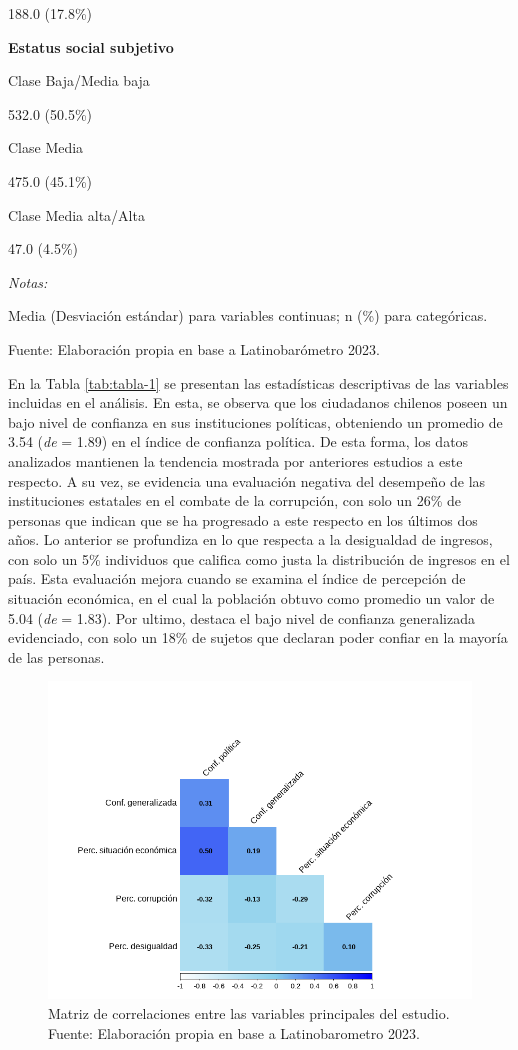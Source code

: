 \documentclass[12pt,twoside]{templates/facsothesis}
\begin{document}
188.0 (17.8\%)

\textbf{Estatus social subjetivo}

Clase Baja/Media baja

532.0 (50.5\%)

Clase Media

475.0 (45.1\%)

Clase Media alta/Alta

47.0 (4.5\%)

{\emph{Notas:}}

Media (Desviación estándar) para variables continuas; n (\%) para categóricas.

Fuente: Elaboración propia en base a Latinobarómetro 2023.

En la Tabla \ref{tab:tabla-1} se presentan las estadísticas descriptivas de las variables incluidas en el análisis. En esta, se observa que los ciudadanos chilenos poseen un bajo nivel de confianza en sus instituciones políticas, obteniendo un promedio de 3.54 (\emph{de} = 1.89) en el índice de confianza política. De esta forma, los datos analizados mantienen la tendencia mostrada por anteriores estudios a este respecto. A su vez, se evidencia una evaluación negativa del desempeño de las instituciones estatales en el combate de la corrupción, con solo un 26\% de personas que indican que se ha progresado a este respecto en los últimos dos años. Lo anterior se profundiza en lo que respecta a la desigualdad de ingresos, con solo un 5\% individuos que califica como justa la distribución de ingresos en el país. Esta evaluación mejora cuando se examina el índice de percepción de situación económica, en el cual la población obtuvo como promedio un valor de 5.04 (\emph{de} = 1.83). Por ultimo, destaca el bajo nivel de confianza generalizada evidenciado, con solo un 18\% de sujetos que declaran poder confiar en la mayoría de las personas.

\begin{figure}[!ht]

{\centering \includegraphics[width=1\linewidth,]{IPO/output/graphs/corrplot} 

}

\caption{Matriz de correlaciones entre las variables principales del estudio. Fuente: Elaboración propia en base a Latinobarometro 2023.}\label{fig:grafico-2}
\end{figure}
\end{document}
